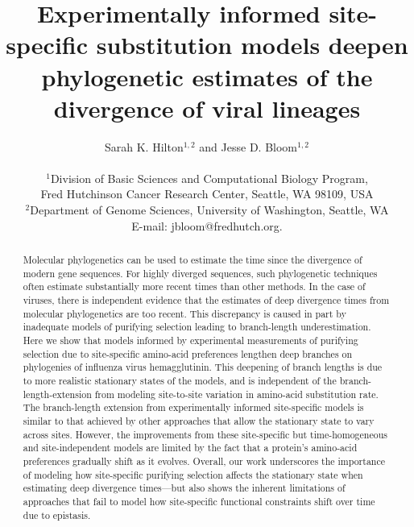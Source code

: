 \documentclass[11pt]{article}
\title{Experimentally informed site-specific substitution models deepen phylogenetic estimates of the divergence of viral lineages}
\author
{Sarah K. Hilton$^{1,2}$  and Jesse D. Bloom$^{1,2}$\\
\\
\normalsize{$^1$Division of Basic Sciences and Computational Biology Program,}\\
\normalsize{Fred Hutchinson Cancer Research Center, Seattle, WA 98109, USA}\\
\normalsize{$^2$Department of Genome Sciences, University of Washington, Seattle, WA}\\
\normalsize{E-mail:  jbloom@fredhutch.org.}\\
}
\date{}
\begin{document}
 


\maketitle 


\begin{abstract}
\noindent  
Molecular phylogenetics can be used to estimate the time since the divergence of modern gene sequences.
For highly diverged sequences, such phylogenetic techniques often estimate substantially more recent times than other methods.
In the case of viruses, there is independent evidence that the estimates of deep divergence times from molecular phylogenetics are too recent.
This discrepancy is caused in part by inadequate models of purifying selection leading to branch-length underestimation.
Here we show that models informed by experimental measurements of purifying selection due to site-specific amino-acid preferences lengthen deep branches on phylogenies of influenza virus hemagglutinin.
This deepening of branch lengths is due to more realistic stationary states of the models, and is independent of the branch-length-extension from modeling site-to-site variation in amino-acid substitution rate.
The branch-length extension from experimentally informed site-specific models is similar to that achieved by other approaches that allow the stationary state to vary across sites.
However, the improvements from these site-specific but time-homogeneous and site-independent models are limited by the fact that a protein's amino-acid preferences gradually shift as it evolves.
Overall, our work underscores the importance of modeling how site-specific purifying selection affects the stationary state when estimating deep divergence times---but also shows the inherent limitations of approaches that fail to model how site-specific functional constraints shift over time due to epistasis. 
\end{abstract}

\clearpage
\end{document}
